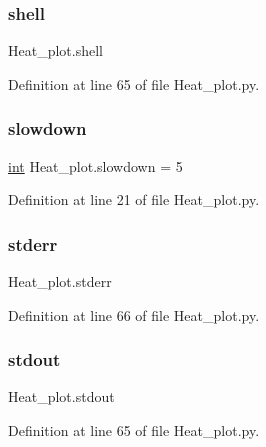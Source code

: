 \subsubsection{\texorpdfstring{shell}{shell}}
{\footnotesize\ttfamily Heat\+\_\+plot.\+shell}



Definition at line 65 of file Heat\+\_\+plot.\+py.

\mbox{\label{namespaceHeat__plot_a116214d215b6a0e66aefae82e2bbd4ef}} 
\subsubsection{\texorpdfstring{slowdown}{slowdown}}
{\footnotesize\ttfamily \hyperlink{namespaceHeat__plot_ac721620fed23609e47f849d804f29546}{int} Heat\+\_\+plot.\+slowdown = 5}



Definition at line 21 of file Heat\+\_\+plot.\+py.

\mbox{\label{namespaceHeat__plot_a67f420128d52c92a8f2e47e60a49efcc}} 
\subsubsection{\texorpdfstring{stderr}{stderr}}
{\footnotesize\ttfamily Heat\+\_\+plot.\+stderr}



Definition at line 66 of file Heat\+\_\+plot.\+py.

\mbox{\label{namespaceHeat__plot_a234d0e0e9df8fdb1fb7d9f280b7949d1}} 
\subsubsection{\texorpdfstring{stdout}{stdout}}
{\footnotesize\ttfamily Heat\+\_\+plot.\+stdout}



Definition at line 65 of file Heat\+\_\+plot.\+py.

\mbox{\label{namespaceHeat__plot_a25a93a2226128530145cc611f350163b}} 
